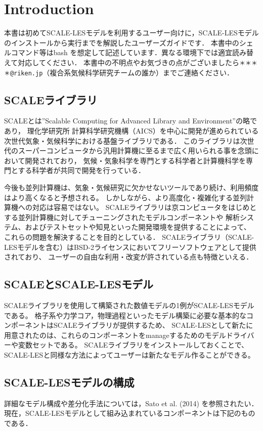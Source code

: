 \section{Introduction}

本書は初めてSCALE-LESモデルを利用するユーザー向けに，SCALE-LESモデルのインストールから実行までを解説したユーザーズガイドです．
本書中のシェルコマンド等はbash を想定して記述しています．異なる環境下では適宜読み替えて対応してください．
本書中の不明点やお気づきの点がございましたら\verb|＊＊＊＊@riken.jp|（複合系気候科学研究チームの誰か）までご連絡ください．

\subsection{SCALEライブラリ}
SCALEとは''Scalable Computing for Advanced Library and Environment''の略であり，
理化学研究所 計算科学研究機構（AICS）を中心に開発が進められている次世代気象・気候科学における基盤ライブラリである．
このライブラリは次世代のスーパーコンピュータから汎用計算機に至るまで広く用いられる事を念頭において開発されており，
気候・気象科学を専門とする科学者と計算機科学を専門とする科学者が共同で開発を行っている．

今後も並列計算機は、気象・気候研究に欠かせないツールであり続け、利用頻度はより高くなると予想される。
しかしながら、より高度化・複雑化する並列計算機への対応は容易ではない。
SCALEライブラリは京コンピュータをはじめとする並列計算機に対してチューニングされたモデルコンポーネントや
解析システム、およびテストセットや知見といった開発環境を提供することによって、
これらの問題を解決することを目的としている．
SCALEライブラリ（SCALE-LESモデルを含む）はBSD-2ライセンスにおいてフリーソフトウェアとして提供されており、
ユーザーの自由な利用・改変が許されている点も特徴といえる．


\subsection{SCALEとSCALE-LESモデル}
SCALEライブラリを使用して構築された数値モデルの1例がSCALE-LESモデルである。
格子系や力学コア，物理過程といったモデル構築に必要な基本的なコンポーネントはSCALEライブラリが提供するため、
SCALE-LESとして新たに用意されたのは、これらのコンポーネントをmanageするためのモデルドライバーや変数セットである。
SCALEライブラリをインストールしておくことで、SCALE-LESと同様な方法によってユーザーは新たなモデル作ることができる。


\subsection{SCALE-LESモデルの構成}
詳細なモデル構成や差分化手法については，Sato et al. (2014) を参照されたい．
現在，SCALE-LESモデルとして組み込まれているコンポーネントは下記のものである．

